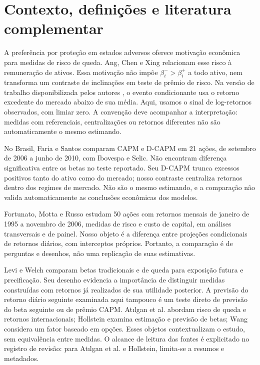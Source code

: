 \section{Contexto, definições e literatura complementar}
A preferência por proteção em estados adversos oferece motivação
econômica para medidas de risco de queda. Ang, Chen e Xing
\cite{ang2006} relacionam esse risco à remuneração de ativos.
Essa motivação não impõe $\beta_i^->\beta_i^+$ a todo ativo, nem
transforma um contraste de inclinações em teste de prêmio de risco.
Na versão de trabalho disponibilizada pelos autores
\cite{ang2004working}, o evento condicionante usa o retorno excedente
do mercado abaixo de sua média. Aqui, usamos o sinal de log-retornos
observados, com limiar zero. A convenção deve acompanhar a interpretação:
medidas com referenciais, centralizações ou retornos diferentes não
são automaticamente o mesmo estimando.

No Brasil, Faria e Santos \cite{faria2010} comparam CAPM e D-CAPM
em 21 ações, de setembro de 2006 a junho de 2010, com Ibovespa e Selic.
Não encontram diferença significativa entre os betas no teste reportado.
Seu D-CAPM trunca excessos positivos tanto do ativo como do mercado;
nosso contraste centraliza retornos dentro dos regimes de mercado.
Não são o mesmo estimando, e a comparação não valida automaticamente
as conclusões econômicas dos modelos.

Fortunato, Motta e Russo \cite{fortunato2010} estudam 50
ações com retornos mensais de janeiro de 1995 a novembro de 2006,
medidas de risco e custo de capital, em análises transversais e de
painel. Nosso objeto é a diferença entre projeções condicionais de
retornos diários, com interceptos próprios. Portanto, a comparação
é de perguntas e desenhos, não uma replicação de suas estimativas.

Levi e Welch \cite{leviwelch2020} comparam betas tradicionais e de
queda para exposição futura e precificação. Seu desenho evidencia a
importância de distinguir medidas construídas com retornos já
realizados de sua utilidade posterior. A previsão do retorno diário
seguinte examinada aqui tampouco é um teste direto de previsão do
beta seguinte ou de prêmio CAPM. At{\i}lgan et al.
\cite{atilgan2018} abordam risco de queda e retornos internacionais;
Hollstein \cite{hollstein2020} examina estimação e previsão de betas;
Wang \cite{wang2023} considera um fator baseado em opções.
Esses objetos contextualizam o estudo, sem equivalência entre medidas.
O alcance de leitura das fontes é explicitado no registro de revisão:
para At{\i}lgan et al. e Hollstein, limita-se a resumos e metadados.


